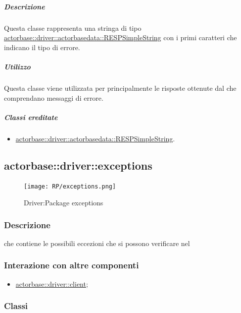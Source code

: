 \documentclass{scalatekids-article}
\begin{document}
\subparagraph{Descrizione}

Questa classe rappresenta una stringa di tipo \hyperref[sec:actorbase::driver::actorbasedata::RESPSimpleString]{actorbase::driver::actorbasedata::RESPSimpleString}
con i primi caratteri che indicano il tipo di errore.

\subparagraph{Utilizzo}

Questa classe viene utilizzata per  principalmente le
risposte ottenute dal  che comprendano messaggi di errore.

\subparagraph{Classi ereditate}

\begin{itemize}
\item \hyperref[sec:actorbase::driver::actorbasedata::RESPSimpleString]{actorbase::driver::actorbasedata::RESPSimpleString}.
\end{itemize}


\subsection{actorbase::driver::exceptions}
\label{sec:actorbase::driver::exceptions}

\begin{figure}[H]
  \begin{center}
    \texttt{[image: RP/exceptions.png]}
    \caption{Driver:Package exceptions}
  \end{center}
\end{figure}

\subsubsection{Descrizione}

 che contiene le possibili eccezioni che si possono verificare nel 

\subsubsection{Interazione con altre componenti}
\begin{itemize}
\item \hyperref[sec:actorbase::driver::client]{actorbase::driver::client};
\end{itemize}

\subsubsection{Classi}
\end{document}
